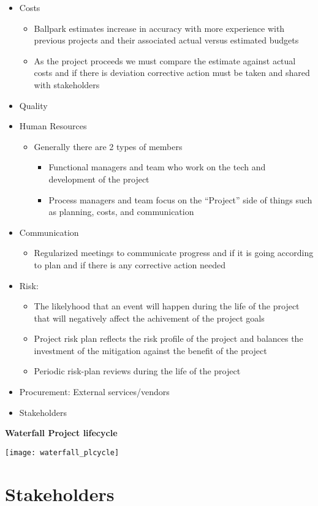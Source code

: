 \documentclass[12pt]{report}
\begin{document}
\begin{itemize}
\begin{itemize}
          \end{itemize}
    \item Costs
          \begin{itemize}
                  \item Ballpark estimates increase in accuracy with more experience with previous projects and their associated actual versus estimated budgets
                  \item As the project proceeds we must compare the estimate against actual costs and if there is deviation corrective action must be taken and shared with stakeholders
          \end{itemize}
    \item Quality
    \item Human Resources
          \begin{itemize}
            \item Generally there are 2 types of members
                  \begin{itemize}
                    \item Functional managers and team who work on the tech and development of the project
                          \item Process managers and team focus on the ``Project'' side of things such as planning, costs, and communication
                  \end{itemize}
          \end{itemize}
    \item Communication
          \begin{itemize}
                  \item Regularized meetings to communicate progress and if it is going according to plan and if there is any corrective action needed
          \end{itemize}
    \item Risk:
          \begin{itemize}
              \item The likelyhood that an event will happen during the life of the project that will negatively affect the achivement of the project goals
                  \item Project risk plan reflects the risk profile of the project and balances the investment of the mitigation against the benefit of the project
                  \item Periodic risk-plan reviews during the life of the project
          \end{itemize}
    \item Procurement: External services/vendors
    \item Stakeholders
  \end{itemize}

\textbf{Waterfall Project lifecycle}

\texttt{[image: waterfall\_plcycle]}

\section{Stakeholders}
\end{document}
